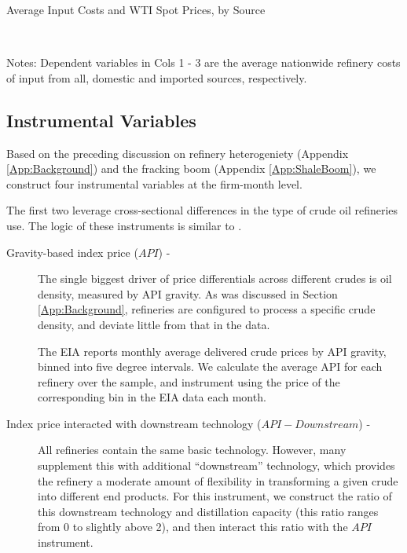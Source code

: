 \documentclass[12pt]{article}
\newcommand{\tablepath}{../output/offline/tables}
\begin{document}
\begin{table}[]
\centering
\caption{Average Input Costs and WTI Spot Prices, by Source \label{tab:input_costs_v_WTI}}
 \\[1ex]
\smallskip{}
\begin{minipage}{.8\linewidth}
\scriptsize
Notes: Dependent variables in Cols 1 - 3 are the average nationwide refinery costs
	of input from all, domestic and imported sources, respectively.
\end{minipage}
\end{table}

\subsection{Instrumental Variables \label{App:IV}}

Based on the preceding discussion on refinery heterogeniety (Appendix \ref{App:Background}) and the fracking boom (Appendix \ref{App:ShaleBoom}), we construct four instrumental variables at the firm-month level.

The first two leverage cross-sectional differences in the type of crude oil refineries use. The logic of these instruments is similar to \cite{bartik_who_1991}.

\begin{description}
  \item[Gravity-based index price ($API$) -] The single biggest driver of price differentials across different crudes is oil density, measured by API gravity. As was discussed in Section \ref{App:Background}, refineries are configured to process a specific crude density, and deviate little from that in the data.

  The EIA reports monthly average delivered crude prices by API gravity, binned into five degree intervals. We calculate the average API for each refinery over the sample, and instrument using the price of the corresponding bin in the EIA data each month.

  \item[Index price interacted with downstream technology ($API-Downstream$) -] All refineries contain the same basic technology. However, many supplement this with additional ``downstream'' technology, which provides the refinery a moderate amount of flexibility in transforming a given crude into different end products. For this instrument, we construct the ratio of this downstream technology and distillation capacity (this ratio ranges from 0 to slightly above 2), and then interact this ratio with the $API$ instrument.

\end{description}
\end{document}
